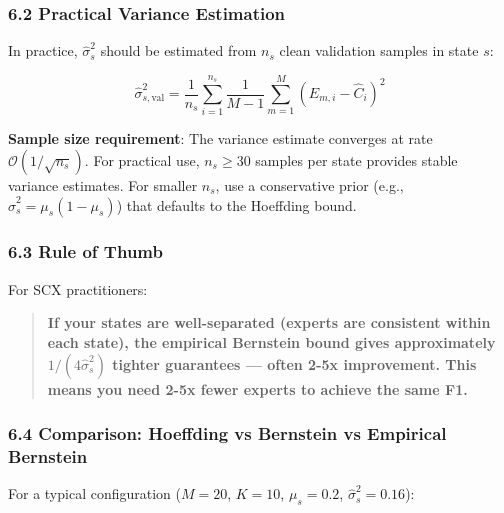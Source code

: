 \documentclass[
  12pt,
]{ctexart}
\begin{document}
\subsubsection{6.2 Practical Variance
Estimation}\label{practical-variance-estimation}

In practice, \(\hat{\sigma}_s^2\) should be estimated from \(n_s\) clean
validation samples in state \(s\):

\[\hat{\sigma}_{s,\text{val}}^2 = \frac{1}{n_s} \sum_{i=1}^{n_s} \frac{1}{M-1} \sum_{m=1}^M (E_{m,i} - \hat{C}_i)^2\]

\textbf{Sample size requirement}: The variance estimate converges at
rate \(\mathcal{O}(1/\sqrt{n_s})\). For practical use, \(n_s \geq 30\)
samples per state provides stable variance estimates. For smaller
\(n_s\), use a conservative prior (e.g.,
\(\hat{\sigma}_s^2 = \mu_s(1-\mu_s)\)) that defaults to the Hoeffding
bound.

\subsubsection{6.3 Rule of Thumb}\label{rule-of-thumb}

For SCX practitioners:

\begin{quote}
\textbf{If your states are well-separated (experts are consistent within
each state), the empirical Bernstein bound gives approximately
\(1/(4\hat{\sigma}_s^2)\) tighter guarantees --- often 2-5x improvement.
This means you need 2-5x fewer experts to achieve the same F1.}
\end{quote}

\subsubsection{6.4 Comparison: Hoeffding vs Bernstein vs Empirical
Bernstein}\label{comparison-hoeffding-vs-bernstein-vs-empirical-bernstein}

For a typical configuration (\(M = 20\), \(K = 10\), \(\mu_s = 0.2\),
\(\hat{\sigma}_s^2 = 0.16\)):
\end{document}
